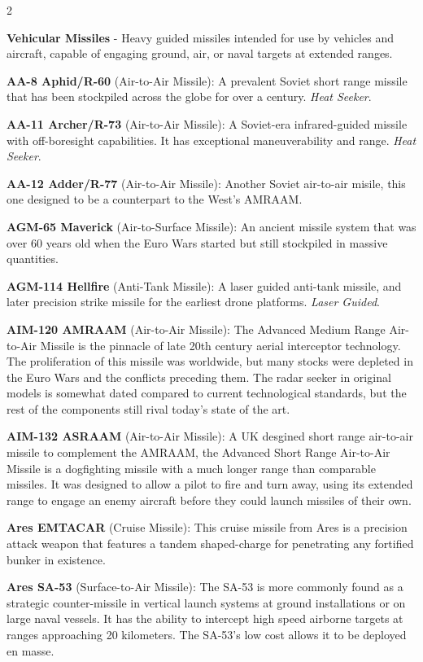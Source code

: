 \documentclass[
  oneside]{article}
\begin{document}
\begin{multicols}{2}

\textbf{Vehicular Missiles} - Heavy guided
missiles intended for use by vehicles and
aircraft, capable of engaging ground, air, or
naval targets at extended ranges.

\textbf{AA-8 Aphid/R-60} (Air-to-Air Missile): A
prevalent Soviet short range missile that has been
stockpiled across the globe for over a century.
\emph{Heat Seeker}.

\textbf{AA-11 Archer/R-73} (Air-to-Air Missile): A
Soviet-era infrared-guided missile with
off-boresight capabilities. It has exceptional
maneuverability and range. \emph{Heat Seeker}.

\textbf{AA-12 Adder/R-77} (Air-to-Air Missile):
Another Soviet air-to-air misile, this one
designed to be a counterpart to the West's AMRAAM.

\textbf{AGM-65 Maverick} (Air-to-Surface Missile):
An ancient missile system that was over 60 years
old when the Euro Wars started but still
stockpiled in massive quantities.

\textbf{AGM-114 Hellfire} (Anti-Tank Missile): A
laser guided anti-tank missile, and later
precision strike missile for the earliest drone
platforms. \emph{Laser Guided}.

\textbf{AIM-120 AMRAAM} (Air-to-Air Missile): The
Advanced Medium Range Air-to-Air Missile is the
pinnacle of late 20th century aerial interceptor
technology. The proliferation of this missile was
worldwide, but many stocks were depleted in the
Euro Wars and the conflicts preceding them. The
radar seeker in original models is somewhat dated
compared to current technological standards, but
the rest of the components still rival today's
state of the art.

\textbf{AIM-132 ASRAAM} (Air-to-Air Missile): A UK
desgined short range air-to-air missile to
complement the AMRAAM, the Advanced Short Range
Air-to-Air Missile is a dogfighting missile with a
much longer range than comparable missiles. It was
designed to allow a pilot to fire and turn away,
using its extended range to engage an enemy
aircraft before they could launch missiles of
their own.

\textbf{Ares EMTACAR} (Cruise Missile): This
cruise missile from Ares is a precision attack
weapon that features a tandem shaped-charge for
penetrating any fortified bunker in existence.

\textbf{Ares SA-53} (Surface-to-Air Missile): The
SA-53 is more commonly found as a strategic
counter-missile in vertical launch systems at
ground installations or on large naval vessels. It
has the ability to intercept high speed airborne
targets at ranges approaching 20 kilometers. The
SA-53's low cost allows it to be deployed en
masse.


\end{multicols}
\end{document}
